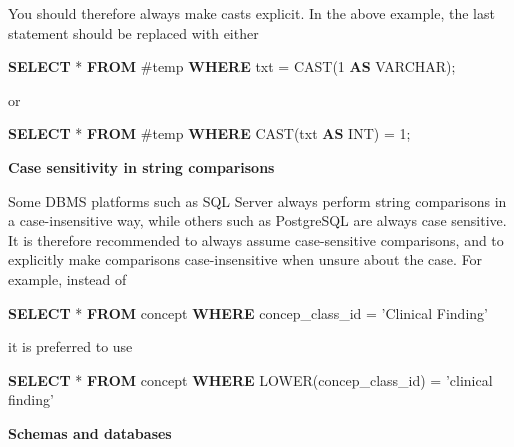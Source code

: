 \documentclass[]{book}
\newenvironment{Shaded}{\begin{snugshade}}{\end{snugshade}}
\newcommand{\KeywordTok}[1]{\textcolor[rgb]{0.13,0.29,0.53}{\textbf{#1}}}
\newcommand{\DataTypeTok}[1]{\textcolor[rgb]{0.13,0.29,0.53}{#1}}
\newcommand{\DecValTok}[1]{\textcolor[rgb]{0.00,0.00,0.81}{#1}}
\newcommand{\StringTok}[1]{\textcolor[rgb]{0.31,0.60,0.02}{#1}}
\newcommand{\FunctionTok}[1]{\textcolor[rgb]{0.00,0.00,0.00}{#1}}
\newcommand{\NormalTok}[1]{#1}
\begin{document}
You should therefore always make casts explicit. In the above example,
the last statement should be replaced with either

\begin{Shaded}
\begin{Highlighting}[]
\KeywordTok{SELECT}\NormalTok{ * }\KeywordTok{FROM}\NormalTok{ #temp }\KeywordTok{WHERE}\NormalTok{ txt = }\FunctionTok{CAST}\NormalTok{(}\DecValTok{1} \KeywordTok{AS} \DataTypeTok{VARCHAR}\NormalTok{);}
\end{Highlighting}
\end{Shaded}

or

\begin{Shaded}
\begin{Highlighting}[]
\KeywordTok{SELECT}\NormalTok{ * }\KeywordTok{FROM}\NormalTok{ #temp }\KeywordTok{WHERE} \FunctionTok{CAST}\NormalTok{(txt }\KeywordTok{AS} \DataTypeTok{INT}\NormalTok{) = }\DecValTok{1}\NormalTok{;}
\end{Highlighting}
\end{Shaded}

\textbf{Case sensitivity in string comparisons}

Some DBMS platforms such as SQL Server always perform string comparisons
in a case-insensitive way, while others such as PostgreSQL are always
case sensitive. It is therefore recommended to always assume
case-sensitive comparisons, and to explicitly make comparisons
case-insensitive when unsure about the case. For example, instead of

\begin{Shaded}
\begin{Highlighting}[]
\KeywordTok{SELECT}\NormalTok{ * }\KeywordTok{FROM}\NormalTok{ concept }\KeywordTok{WHERE}\NormalTok{ concep_class_id = }\StringTok{'Clinical Finding'}
\end{Highlighting}
\end{Shaded}

it is preferred to use

\begin{Shaded}
\begin{Highlighting}[]
\KeywordTok{SELECT}\NormalTok{ * }\KeywordTok{FROM}\NormalTok{ concept }\KeywordTok{WHERE} \FunctionTok{LOWER}\NormalTok{(concep_class_id) = }\StringTok{'clinical finding'}
\end{Highlighting}
\end{Shaded}

\textbf{Schemas and databases}
\end{document}
